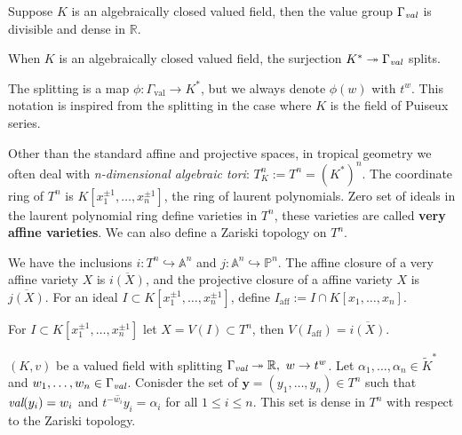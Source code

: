     \begin{lemma}
        Suppose $K$ is an algebraically closed valued field, then the value group $\Gamma_{\emph{val}}$ is divisible and dense in $\mathbb{R}$.
    \end{lemma}

    \begin{lemma}
        When $K$ is an algebraically closed valued field, the surjection $K^{*} \twoheadrightarrow \Gamma_{\emph{val}}$ splits.
    \end{lemma}

    The splitting is a map $\phi: \Gamma_{\text{val}} \to K^{*}$, but we always denote $\phi(w)$ with $t^w$. This notation is inspired from the splitting in the case where $K$ is the field of Puiseux series.
    \par Other than the standard affine and projective spaces, in tropical geometry we often deal with \textit{n-dimensional algebraic tori}: $T^{n}_{K} := T^n = (K^{*})^n$. 
    The coordinate ring of $T^{n}$ is $K[x_{1}^{\pm 1},\dots,x_{n}^{\pm 1}]$, the ring of laurent polynomials. 
    Zero set of ideals in the laurent polynomial ring define varieties in $T^n$, these varieties are called \textbf{very affine varieties}. We can also define a Zariski topology on $T^{n}$.
    \par We have the inclusions $i: T^{n} \hookrightarrow \mathbb{A}^n$ and $j: \mathbb{A}^{n} \hookrightarrow \mathbb{P}^{n}$. 
    The affine closure of a very affine variety $X$ is $\overline{i(X)}$, and the projective closure of a affine variety $X$ is $\overline{j(X)}$. 
    For an ideal $I \subset K[x_{1}^{\pm 1},\dots,x_{n}^{\pm 1}]$, define $I_{\text{aff}}:= I \cap K[x_{1},\dots,x_{n}]$.

    \begin{proposition}
        For $I \subset K[x_{1}^{\pm 1},\dots,x_{n}^{\pm 1}]$ let $X = V(I) \subset T^n$, then $V(I_{\text{aff}}) = \overline{i(X)}$.
    \end{proposition}

    \begin{proposition}
        \label{densenessprop}
        $(K,v)$ be a valued field with splitting $\Gamma_{\emph{val}} \twoheadrightarrow \mathbb{R},~w \to t^{w}$.
        Let $\alpha_{1}, \dots,\alpha_{n} \in \tilde{K}^{*}$ and $w_1, \dots, w_n \in \Gamma_{\emph{val}}$. 
        Conisder the set of $\textbf{y} = (y_1, \dots, y_n) \in T^{n}$ such that $\emph{val}(y_{i}) = w_{i}$ and $\overline{t^{-w_i}y_i} = \alpha_{i}$ for all $1\leq i \leq n$.
        This set is dense in $T^n$ with respect to the Zariski topology.
    \end{proposition}

